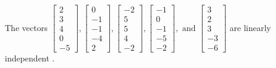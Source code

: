 \begin{exercise}
\begin{exerciseStatement}
  \end{exerciseStatement}
  \begin{exerciseAnswer}
   The vectors \(\left[\begin{array}{r}
2 \\
3 \\
4 \\
0 \\
-5
\end{array}\right] , \left[\begin{array}{r}
0 \\
-1 \\
-1 \\
-4 \\
2
\end{array}\right] , \left[\begin{array}{r}
-2 \\
5 \\
5 \\
4 \\
-2
\end{array}\right] , \left[\begin{array}{r}
-1 \\
0 \\
-1 \\
-5 \\
-2
\end{array}\right] , \text{ and } \left[\begin{array}{r}
3 \\
2 \\
3 \\
-3 \\
-6
\end{array}\right]\) are 
  	 linearly independent  .
  


  \end{exerciseAnswer}
\end{exercise}